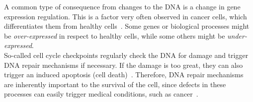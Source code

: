 A common type of consequence from changes to the DNA is a change in gene expression regulation. This is a factor very often observed in cancer cells, which differentiates them from healthy cells~\cite{molecular_cell_biology}. Some genes or biological processes might be \textit{over-expressed} in respect to healthy cells, while some others might be \textit{under-expressed}.\\
So-called cell cycle checkpoints regularly check the DNA for damage and trigger DNA repair mechanisms if necessary. If the damage is too great, they can also trigger an induced apoptosis (cell death)~\cite{dna_repair_genetic_instability_and_cancer}. Therefore, DNA repair mechanisms are inherently important to the survival of the cell, since defects in these processes can easily trigger medical conditions, such as cancer~\cite{dna_damage_cancer}.\\

